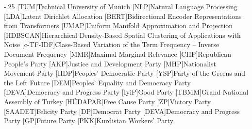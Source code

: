 \documentclass[headsepline,footsepline,footinclude=false,oneside,fontsize=11pt,paper=a4,listof=totoc,bibliography=totoc]{scrbook} %
\begin{document}


\frontmatter{}





\tableofcontents{}

\mainmatter{}









\appendix{}




\begin{acronym}
	\itemsep-.25\baselineskip
	[TUM]{Technical University of Munich}
	[NLP]{Natural Language Processing}
	[LDA]{Latent Dirichlet Allocation}
	[BERT]{Bidirectional Encoder Representations from Transformers}
	[UMAP]{Uniform Manifold Approximation and Projection}
	[HDBSCAN]{Hierarchical Density-Based Spatial Clustering of Applications with Noise}
	[c-TF-IDF]{Class-Based Variation of the Term Frequency – Inverse Document Frequency}
	[MMR]{Maximal Marginal Relevance}
	[CHP]{Republican People's Party}
	[AKP]{Justice and Development Party}
	[MHP]{Nationalist Movement Party}
	[HDP]{Peoples' Democratic Party}
	[YSP]{Party of the Greens and the Left Future}
	[DEM]{Peoples' Equality and Democracy Party}
	[DEVA]{Democracy and Progress Party}
	[IyiP]{Good Party}
	[TBMM]{Grand National Assembly of Turkey}
	[HÜDAPAR]{Free Cause Party}
	[ZP]{Victory Party}
	[SAADET]{Felicity Party}
	[DP]{Democrat Party}
	[DEVA]{Democracy and Progress Party}
	[GP]{Future Party}
	[PKK]{Kurdistan Workers' Party}
\end{acronym}

\listoffigures{}
\listoftables{}
\printbibliography{}
\end{document}
